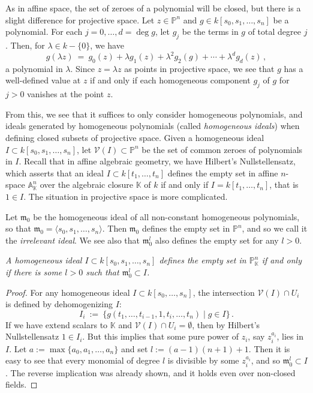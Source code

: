 \documentclass[12pt]{amsart}
\begin{document}
As in affine space, the set of zeroes of a polynomial will be closed, but
there is a slight difference for projective space.
Let $z\in{\mathbb P}^n$ and $g\in k[s_0,s_1,\ldots,s_n]$ be a polynomial.
For each $j=0,\ldots,d=\deg g$, let $g_j$ be the terms in $g$ of total
degree $j$.
Then, for $\lambda\in k-\{0\}$, we have
$$
  g(\lambda z)\ =\ g_0(z) + \lambda g_1(z) 
               + \lambda^2 g_2(g) + \cdots + \lambda^d g_d(z)\,,
$$
a polynomial in $\lambda$.
Since $z=\lambda z$ as points in projective space, we see that $g$ has a
well-defined value at $z$ if and only if each homogeneous component $g_j$ of
$g$ for $j>0$ vanishes at the point $z$.


From this, we see that it suffices to only consider homogeneous polynomials,
and ideals generated by homogeneous polynomials
(called {\sl homogeneous ideals}) when defining closed subsets of projective
space.
Given a homogeneous ideal $I\subset k[s_0,s_1,\ldots,s_n]$, let 
${\mathcal V}(I)\subset{\mathbb P}^n$ be the set of common zeroes of
polynomials in $I$.
Recall that in affine algebraic geometry, we have Hilbert's Nullstellensatz,
which asserts that an ideal $I\subset k[t_1,\ldots,t_n]$ defines the empty
set in affine $n$-space ${\mathbb A}^n_{\mathbb K}$ over the algebraic
closure ${\mathbb K}$ of $k$ if  and only if $I=k[t_1,\ldots,t_n]$, that is 
$1\in I$.
The situation in projective space is more complicated.

Let ${\mathfrak m}_0$ be the homogeneous ideal of all non-constant
homogeneous polynomials, so that 
${\mathfrak m}_0=\langle s_0,s_1,\ldots,s_n\rangle$.
Then ${\mathfrak m}_0$ defines the empty set in ${\mathbb P}^n$, and so we
call it the {\sl irrelevant ideal}.
We see also that ${\mathfrak m}_0^l$ also defines the empty set for any
$l>0$.
\medskip

{\it 
A homogeneous ideal $I\subset k[s_0,s_1,\ldots,s_n]$ defines the empty set
in ${\mathbb P}^n_{\mathbb K}$ if and only if 
there is some $l>0$ such that ${\mathfrak m}_0^l\subset I$.
}\medskip

\begin{proof}
For any homogeneous ideal $I\subset k[s_0,\ldots,s_n]$, the intersection
${\mathcal V}(I)\cap U_i$ is defined by dehomogenizing $I$:
$$
  I_i\ :=\ \{g(t_1,\ldots,t_{i-1},1,t_i,\ldots,t_n)\mid g\in I\}\,.
$$
If we have extend scalars to ${\mathbb K}$ and 
${\mathcal V}(I)\cap U_i=\emptyset$, then by Hilbert's Nullstellensatz
$1\in I_i$.
But this implies that some pure power of $z_i$, say $z_i^{a_i}$, lies in
$I$.
Let $a:=\max\{a_0,a_1,\ldots,a_n\}$ and set $l:=(a-1)(n+1)+1$.
Then it is easy to see that every monomial of degree $l$ is divisible by
some $z_i^{a_i}$, and so ${\mathfrak m}_0^l\subset I$.
The reverse implication was already shown, and it holds even over non-closed
fields.
\end{proof}
\end{document}
